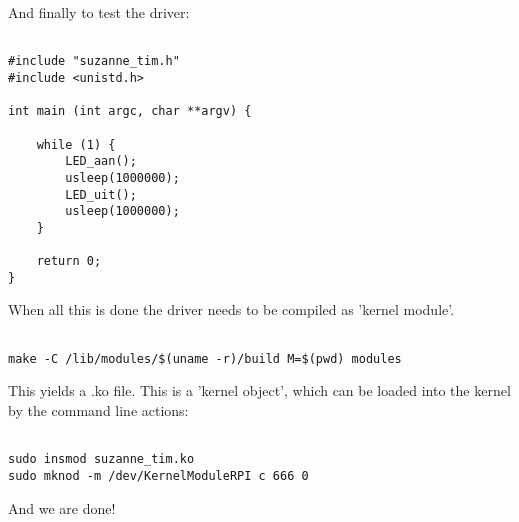 \documentclass[
10pt, %
a4paper, %
oneside, %
headinclude,footinclude, %
BCOR5mm, %
]{scrartcl}
\begin{document}
And finally to test the driver:

\begin{lstlisting}

#include "suzanne_tim.h"
#include <unistd.h>

int main (int argc, char **argv) {

    while (1) {
        LED_aan();
        usleep(1000000);
        LED_uit();
        usleep(1000000);
    }

    return 0;
}

\end{lstlisting}

When all this is done the driver needs to be compiled as 'kernel module'.

\begin{lstlisting}

make -C /lib/modules/$(uname -r)/build M=$(pwd) modules

\end{lstlisting}

This yields a .ko file. This is a 'kernel object', which can be loaded into the kernel by the command line actions:

\begin{lstlisting}

sudo insmod suzanne_tim.ko
sudo mknod -m /dev/KernelModuleRPI c 666 0

\end{lstlisting}

And we are done!
\end{document}
